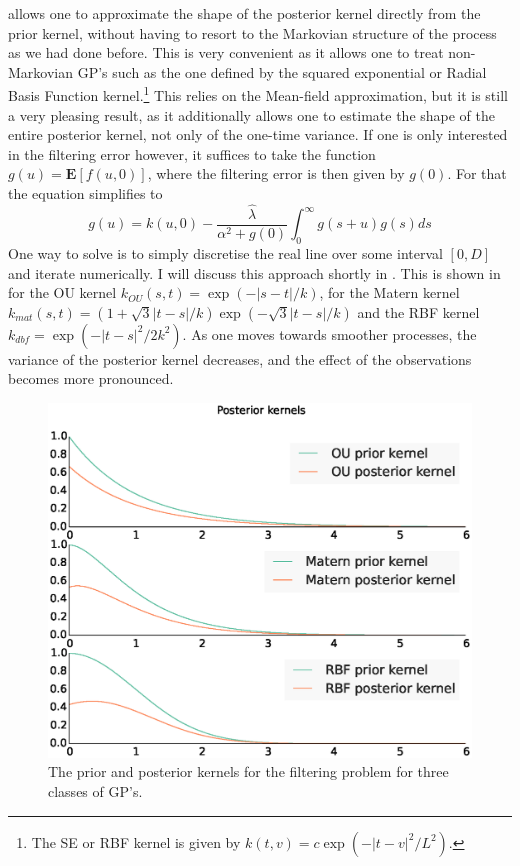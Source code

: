  allows one to approximate the shape of the posterior kernel directly from the prior kernel, without having to resort to the Markovian structure of
the process as we had done before. This is very convenient as it allows one to treat non-Markovian GP's such as the one defined by the squared exponential or Radial
Basis Function kernel.\footnote{The SE or RBF kernel is given by $k(t,v) = c \exp(-|t-v|^2/L^2)$.} This relies on the Mean-field approximation, but it is
still a very pleasing result, as it additionally allows one to estimate the shape of the entire posterior kernel, not only of the one-time variance. If one is only interested
in the filtering error however, it suffices to take the function $g(u) = \boldsymbol{E}\left[f(u,0)\right]$, where the filtering error is then given by $g(0)$. For that the equation simplifies to
\begin{equation}
\label{eq:integral_one_point}
g(u) = k(u,0)  - \frac{\hat{\lambda}}{\alpha^2+ g(0)} \int_0^\infty g(s+u)g(s) ds
\end{equation}
One way to solve  is to simply discretise the real line over some interval $[0,D]$ and iterate  numerically. I will discuss this approach shortly in . This is shown in  for the OU kernel $k_{OU}(s,t) = \exp(-|s-t|/k)$, for the Matern kernel $k_{mat}(s,t) = (1+\sqrt{3}|t-s|/k) \exp(-\sqrt{3}|t-s|/k)$ and the 
RBF kernel $k_{dbf} = \exp(-|t-s|^2/2k^2)$. As one moves towards smoother processes, the variance of the posterior kernel decreases, and the effect of the observations becomes more pronounced.

\begin{figure}
\label{fig:integral_kernel}
\includegraphics[width=\columnwidth]{figures/figure_3_4.eps}
\caption[Posterior kernels for general Gaussian processes]{The prior and posterior kernels for the filtering problem for three classes of GP's.}
\end{figure}

